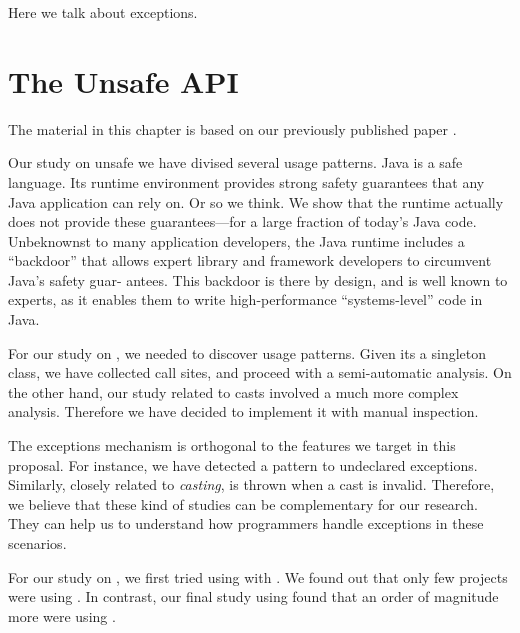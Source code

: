 \documentclass{usiinfdocprop}
\begin{document}
Here we talk about exceptions.

\chapter{The \java{} Unsafe API \label{org10050e6}}
\label{sec:orgdcd7031}

The material in this chapter is based on our previously published paper \citep{mastrangelo_use_2015}.

Our study on unsafe we have divised several usage patterns.
Java is a safe language. Its runtime environment provides strong safety guarantees that any Java application can rely on. Or so we think. We show that the runtime actually does not provide these guarantees—for a large fraction of today’s Java code. Unbeknownst to many application developers, the Java runtime includes a “backdoor” that allows expert library and framework developers to circumvent Java’s safety guar- antees. This backdoor is there by design, and is well known to experts, as it enables them to write high-performance “systems-level” code in Java.

For our study on \smu{}, we needed to discover usage patterns.
Given its a singleton class, we have collected call sites, and proceed with a semi-automatic analysis.
On the other hand, our study related to casts involved a much more complex analysis.
Therefore we have decided to implement it with manual inspection.

The exceptions mechanism is orthogonal to the features we target in this proposal.
For instance, we have detected a \smu{} pattern to \throw{} undeclared exceptions.
Similarly, closely related to \emph{casting}, \cce{} is thrown when a cast is invalid.
Therefore, we believe that these kind of studies can be complementary for our research.
They can help us to understand how programmers handle exceptions in these scenarios.

For our study on \smu{}, we first tried using \boa{} with \sourceforge{}.
We found out that only few projects were using \smu{}.
In contrast, our final study using \maven{} found that an order of magnitude more were using \smu{}.



\end{document}
